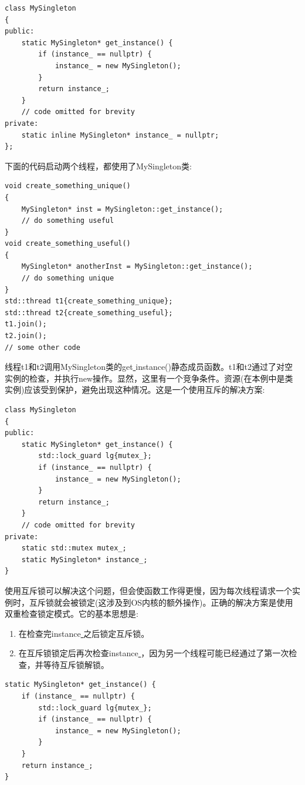 \begin{lstlisting}[caption={}]
class MySingleton
{
public:
	static MySingleton* get_instance() {
		if (instance_ == nullptr) {
			instance_ = new MySingleton();
		}
		return instance_;
	}
	// code omitted for brevity
private:
	static inline MySingleton* instance_ = nullptr;
};
\end{lstlisting}

下面的代码启动两个线程，都使用了MySingleton类: \par

\begin{lstlisting}[caption={}]
void create_something_unique()
{
	MySingleton* inst = MySingleton::get_instance();
	// do something useful
}
void create_something_useful()
{
	MySingleton* anotherInst = MySingleton::get_instance();
	// do something unique
}
std::thread t1{create_something_unique};
std::thread t2{create_something_useful};
t1.join();
t2.join();
// some other code
\end{lstlisting}

线程t1和t2调用MySingleton类的get\underline{ }instance()静态成员函数。t1和t2通过了对空实例的检查，并执行new操作。显然，这里有一个竞争条件。资源(在本例中是类实例)应该受到保护，避免出现这种情况。这是一个使用互斥的解决方案: \par

\begin{lstlisting}[caption={}]
class MySingleton
{
public:
	static MySingleton* get_instance() {
		std::lock_guard lg{mutex_};
		if (instance_ == nullptr) {
			instance_ = new MySingleton();
		}
		return instance_;
	}
	// code omitted for brevity
private:
	static std::mutex mutex_;
	static MySingleton* instance_;
}
\end{lstlisting}

使用互斥锁可以解决这个问题，但会使函数工作得更慢，因为每次线程请求一个实例时，互斥锁就会被锁定(这涉及到OS内核的额外操作)。正确的解决方案是使用双重检查锁定模式。它的基本思想是: \par

\begin{enumerate}
	\item 在检查完instance\underline{ }之后锁定互斥锁。
	\item 在互斥锁锁定后再次检查instance\underline{ }，因为另一个线程可能已经通过了第一次检查，并等待互斥锁解锁。
\end{enumerate}

\begin{lstlisting}[caption={}]
static MySingleton* get_instance() {
	if (instance_ == nullptr) {
		std::lock_guard lg{mutex_};
		if (instance_ == nullptr) {
			instance_ = new MySingleton();
		}
	}
	return instance_;
}
\end{lstlisting}

